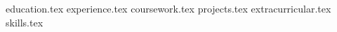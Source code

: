 \documentclass{awesome-cv}
\newcommand*{\sectiondir}{resume/}
\begin{document}
\makecvheader


{education.tex}
{experience.tex}
{coursework.tex}
{projects.tex}
{extracurricular.tex}
{skills.tex}
\end{document}
